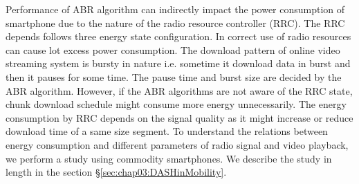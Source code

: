 Performance of ABR algorithm can indirectly impact the power consumption of smartphone due to the nature of the radio resource controller (RRC). The RRC depends follows three energy state configuration. In correct use of radio resources can cause lot excess power consumption. The download pattern of online video streaming system is bursty in nature i.e. sometime it download data in burst and then it pauses for some time. The pause time and burst size are decided by the ABR algorithm. However, if the ABR algorithms are not aware of the RRC state, chunk download schedule might consume more energy unnecessarily. The energy consumption by RRC depends on the signal quality as it might increase or reduce download time of a same size segment. To understand the relations between energy consumption and different parameters of radio signal and video playback, we perform a study using commodity smartphones. We describe the study in length in the section \S\ref{sec:chap03:DASHinMobility}.

%

